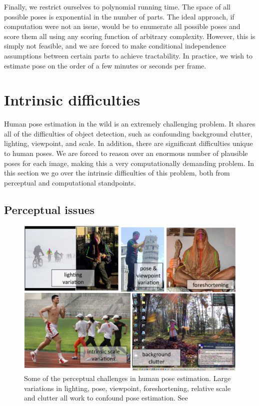 Finally, we restrict ourselves to polynomial running time.  The space of all 
possible poses is exponential in the number of parts. The ideal approach, if 
computation were not an issue, would be to enumerate all possible poses and 
score them all using any scoring function of arbitrary complexity. However, 
this is simply not feasible, and we are forced to make conditional independence 
assumptions between certain parts to achieve tractability.  In practice, we 
wish to estimate pose on the order of a few minutes or seconds per frame.

\section{Intrinsic difficulties}
Human pose estimation in the wild is an extremely challenging problem.  It 
shares all of the difficulties of object detection, such as confounding 
background clutter, lighting, viewpoint, and scale. In addition, there are 
significant difficulties unique to human poses.  We are forced to reason over 
an enormous number of plausible poses for each image, making this a very 
computationally demanding problem.  In this section we go over the intrinsic 
difficulties of this problem, both from perceptual and computational 
standpoints.

\subsection{Perceptual issues}\label{sec:perceptual}
\begin{figure}[tb]
\begin{center}
\includegraphics[width=1.05\textwidth]{figs/perceptual-issues.pdf}
\caption[Perceptual difficulties in pose estimation]{Some of the perceptual 
challenges in human pose estimation.  Large variations in lighting, pose, 
viewpoint, foreshortening, relative scale and clutter all work to confound pose 
estimation.  See~}
\label{fig:perceptual-issues}
\end{center}
\end{figure}

